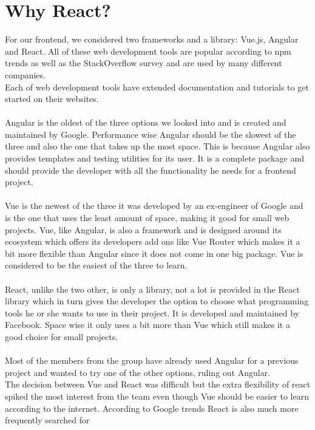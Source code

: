\section{Why React?}

For our frontend, we considered two frameworks and a library: Vue.js, Angular and React.
All of these web development tools are popular according to npm trends as well as the StackOverflow survey and are used by many different companies\cite{VueReactAngular}.
\\
Each of web development tools have extended documentation and tutorials to get started on their websites.
\\\\
Angular is the oldest of the three options we looked into and is created and maintained by Google.
Performance wise Angular should be the slowest of the three and also the one that takes up the most space.
This is because Angular also provides templates and testing utilities for its user.
It is a complete package and should provide the developer with all the functionality he needs for a frontend project.
\\\\
Vue is the newest of the three it was developed by an ex-engineer of Google and is the one that uses the least amount of space, making it good for small web projects.
Vue, like Angular, is also a framework and is designed around its ecosystem which offers its developers add ons like Vue Router which makes it a bit more flexible than Angular since it does not come in one big package.
Vue is considered to be the easiest of the three to learn.
\\\\
React, unlike the two other, is only a library\cite{ReactJS}, not a lot is provided in the React library which in turn gives the developer the option to choose what programming tools he or she wants to use in their project.
It is developed and maintained by Facebook.
Space wise it only uses a bit more than Vue which still makes it a good choice for small projects.
\\\\
Most of the members from the group have already used Angular for a previous project and wanted to try one of the other options, ruling out Angular. 
\\
The decision between Vue and React was difficult but the extra flexibility of react spiked the most interest from the team even though Vue should be easier to learn according to the internet\cite{ComparisonWithOtherFrameworks}.
According to Google trends React is also much more frequently searched for 

